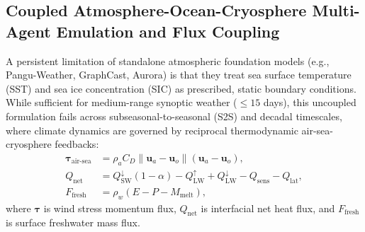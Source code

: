 \subsection{Coupled Atmosphere-Ocean-Cryosphere Multi-Agent Emulation and Flux Coupling}
\label{sec:coupled_earth_emulation}
A persistent limitation of standalone atmospheric foundation models (e.g., Pangu-Weather, GraphCast, Aurora) is that they treat sea surface temperature (SST) and sea ice concentration (SIC) as prescribed, static boundary conditions. While sufficient for medium-range synoptic weather ($\le 15$ days), this uncoupled formulation fails across subseasonal-to-seasonal (S2S) and decadal timescales, where climate dynamics are governed by reciprocal thermodynamic air-sea-cryosphere feedbacks:
\begin{align}
    \boldsymbol{\tau}_{\text{air-sea}} &= \rho_a C_D \|\mathbf{u}_a - \mathbf{u}_o\| (\mathbf{u}_a - \mathbf{u}_o), \label{eq:wind_stress} \\
    Q_{\text{net}} &= Q_{\text{SW}}^\downarrow (1 - \alpha) - Q_{\text{LW}}^\uparrow + Q_{\text{LW}}^\downarrow - Q_{\text{sens}} - Q_{\text{lat}}, \label{eq:heat_flux} \\
    F_{\text{fresh}} &= \rho_w \left( E - P - M_{\text{melt}} \right), \label{eq:freshwater_flux}
\end{align}
where $\boldsymbol{\tau}$ is wind stress momentum flux, $Q_{\text{net}}$ is interfacial net heat flux, and $F_{\text{fresh}}$ is surface freshwater mass flux.


